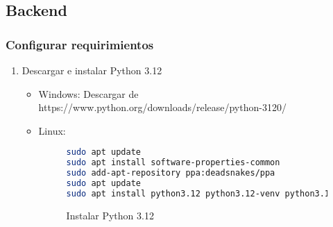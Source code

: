 \subsection{Backend}
\subsubsection*{Configurar requirimientos}
\begin{enumerate}
	\item Descargar e instalar Python 3.12
	\begin{itemize}
	\item Windows:
	Descargar de https://www.python.org/downloads/release/python-3120/
	\item Linux:

	\begin{figure}
	\begin{lstlisting}[language=bash]
sudo apt update
sudo apt install software-properties-common
sudo add-apt-repository ppa:deadsnakes/ppa
sudo apt update
sudo apt install python3.12 python3.12-venv python3.12-dev
        \end{lstlisting}
        \caption{Instalar Python 3.12}
        \label{fig:install-python}
        \end{figure}
	\end{itemize}
\end{enumerate}

